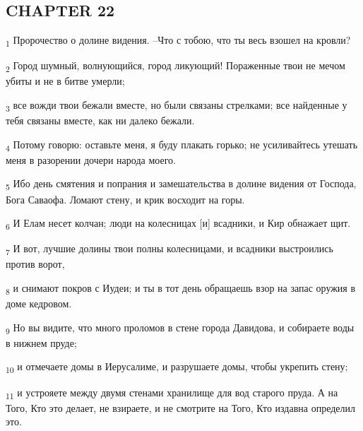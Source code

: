 \subsection{CHAPTER 22}
\begin{tcolorbox}
\textsubscript{1} Пророчество о долине видения. --Что с тобою, что ты весь взошел на кровли?
\end{tcolorbox}
\begin{tcolorbox}
\textsubscript{2} Город шумный, волнующийся, город ликующий! Пораженные твои не мечом убиты и не в битве умерли;
\end{tcolorbox}
\begin{tcolorbox}
\textsubscript{3} все вожди твои бежали вместе, но были связаны стрелками; все найденные у тебя связаны вместе, как ни далеко бежали.
\end{tcolorbox}
\begin{tcolorbox}
\textsubscript{4} Потому говорю: оставьте меня, я буду плакать горько; не усиливайтесь утешать меня в разорении дочери народа моего.
\end{tcolorbox}
\begin{tcolorbox}
\textsubscript{5} Ибо день смятения и попрания и замешательства в долине видения от Господа, Бога Саваофа. Ломают стену, и крик восходит на горы.
\end{tcolorbox}
\begin{tcolorbox}
\textsubscript{6} И Елам несет колчан; люди на колесницах [и] всадники, и Кир обнажает щит.
\end{tcolorbox}
\begin{tcolorbox}
\textsubscript{7} И вот, лучшие долины твои полны колесницами, и всадники выстроились против ворот,
\end{tcolorbox}
\begin{tcolorbox}
\textsubscript{8} и снимают покров с Иудеи; и ты в тот день обращаешь взор на запас оружия в доме кедровом.
\end{tcolorbox}
\begin{tcolorbox}
\textsubscript{9} Но вы видите, что много проломов в стене города Давидова, и собираете воды в нижнем пруде;
\end{tcolorbox}
\begin{tcolorbox}
\textsubscript{10} и отмечаете домы в Иерусалиме, и разрушаете домы, чтобы укрепить стену;
\end{tcolorbox}
\begin{tcolorbox}
\textsubscript{11} и устрояете между двумя стенами хранилище для вод старого пруда. А на Того, Кто это делает, не взираете, и не смотрите на Того, Кто издавна определил это.
\end{tcolorbox}
